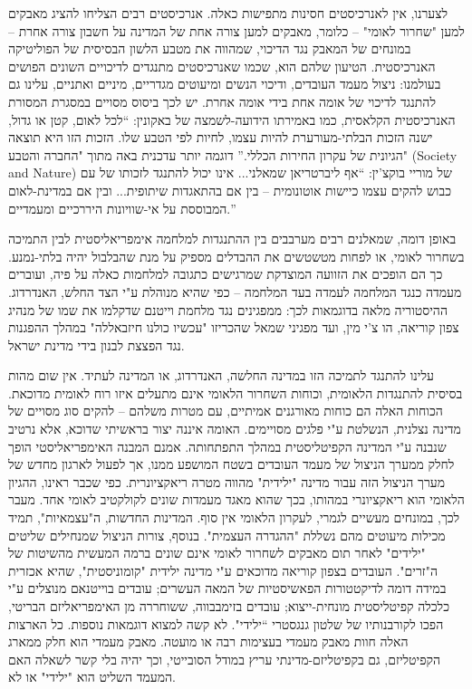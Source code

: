 לצערנו, אין לאנרכיסטים חסינות מתפישות כאלה. אנרכיסטים רבים הצליחו להציג מאבקים למען "שחרור לאומי" – כלומר, מאבקים למען צורה אחת של המדינה על חשבון צורה אחרת – במונחים של המאבק נגד הדיכוי, שמהווה את מטבע הלשון הבסיסית של הפוליטיקה האנרכיסטית. הטיעון שלהם הוא, שכמו שאנרכיסטים מתנגדים לדיכויים השונים הפושים בעולמנו: ניצול מעמד העובדים, ודיכוי הנשים ומיעוטים מגדריים, מיניים ואתניים, עלינו גם להתנגד לדיכוי של אומה אחת בידי אומה אחרת. יש לכך ביסוס מסויים במסגרת המסורת האנרכיסטית הקלאסית, כמו באמירתו הידועה-לשמצה של באקונין: “לכל לאום, קטן או גדול, ישנה הזכות הבלתי-מעורערת להיות עצמו, לחיות לפי הטבע שלו. הזכות הזו היא תוצאה הגיונית של עקרון החירות הכללי.” דוגמה יותר עדכנית באה מתוך "החברה והטבע" (Society and Nature) של מוריי בוקצ'ין: “אף ליברטריאן שמאלני... אינו יכול להתנגד לזכותו של עם כבוש להקים עצמו כיישות אוטונומית – בין אם בהתאגדות שיתופית... ובין אם במדינת-לאום המבוססת על אי-שוויונות היררכיים ומעמדיים.”

באופן דומה, שמאלנים רבים מערבבים בין ההתנגדות למלחמה אימפריאליסטית לבין התמיכה בשחרור לאומי, או לפחות מטשטשים את ההבדלים מספיק על מנת שהבלבול יהיה בלתי-נמנע. כך הם הופכים את הזוועה המוצדקת שמרגישים כתגובה למלחמות כאלה על פיה, ועוברים מעמדה כנגד המלחמה לעמדה בעד המלחמה – כפי שהיא מנוהלת ע"י הצד החלש, האנדרדוג. ההיסטוריה מלאה בדוגמאות לכך: ממפגינים נגד מלחמת וייטנם שדקלמו את שמו של מנהיג צפון קוריאה, הו צ'י מין, ועד מפגיני שמאל שהכריזו "עכשיו כולנו חיזבאללה" במהלך ההפגנות נגד הפצצת לבנון בידי מדינת ישראל.

עלינו להתנגד לתמיכה הזו במדינה החלשה, האנדרדוג, או המדינה לעתיד. אין שום מהות בסיסית להתנגדות הלאומית, וכוחות השחרור הלאומי אינם מתעלים איזו רוח לאומית מדוכאת. הכוחות האלה הם כוחות מאורגנים אמיתיים, עם מטרות משלהם – להקים סוג מסויים של מדינה נצלנית, הנשלטת ע"י פלגים מסויימים. האומה איננה יצור בראשיתי שדוכא, אלא נרטיב שנבנה ע"י המדינה הקפיטליסטית במהלך התפתחותה. אמנם המבנה האימפריאליסטי הופך לחלק ממערך הניצול של מעמד העובדים בשטח המושפע ממנו, אך לפעול לארגון מחדש של מערך הניצול הזה עבור מדינה "ילידית" מהווה מטרה ריאקציונרית. כפי שכבר ראינו, ההגיון הלאומי הוא ריאקציונרי במהותו, בכך שהוא מאגד מעמדות שונים לקולקטיב לאומי אחד. מעבר לכך, במונחים מעשיים לגמרי, לעקרון הלאומי אין סוף. המדינות החדשות, ה"עצמאיות", תמיד מכילות מיעוטים מהם נשללת "ההגדרה העצמית". בנוסף, צורות הניצול שמנחילים שליטים "ילידים" לאחר תום מאבקים לשחרור לאומי אינם שונים ברמה המעשית מהשיטות של ה"זרים". העובדים בצפון קוריאה מדוכאים ע"י מדינה ילידית "קומוניסטית", שהיא אכזרית במידה דומה לדיקטטורות הפאשיסטיות של המאה העשרים; עובדים בוייטנאם מנוצלים ע"י כלכלה קפיטליסטית מונחית-ייצוא; עובדים בזימבבווה, ששוחררה מן האימפריאליזם הבריטי, הפכו לקורבנותיו של שלטון גנגסטרי “ילידי". לא קשה למצוא דוגמאות נוספות. כל הארצות האלה חוות מאבק מעמדי בעצימות רבה או מועטה. מאבק מעמדי הוא חלק ממארג הקפיטליזם, גם בקפיטליזם-מדינתי עריץ במודל הסובייטי, וכך יהיה בלי קשר לשאלה האם המעמד השליט הוא "ילידי" או לא.

